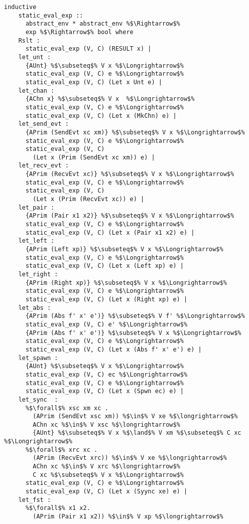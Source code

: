 \documentclass{article}
\begin{document}
\begin{lstlisting}[style=codestyle1, escapechar=\%]
  inductive
    static_eval_exp ::
      abstract_env * abstract_env %$\Rightarrow$%
      exp %$\Rightarrow$% bool where
    Rslt :
      static_eval_exp (V, C) (RESULT x) |
    let_unt :
      {AUnt} %$\subseteq$% V x %$\Longrightarrow$%
      static_eval_exp (V, C) e %$\Longrightarrow$% 
      static_eval_exp (V, C) (Let x Unt e) |
    let_chan : 
      {AChn x} %$\subseteq$% V x  %$\Longrightarrow$%
      static_eval_exp (V, C) e %$\Longrightarrow$%
      static_eval_exp (V, C) (Let x (MkChn) e) |
    let_send_evt : 
      {APrim (SendEvt xc xm)} %$\subseteq$% V x %$\Longrightarrow$%
      static_eval_exp (V, C) e %$\Longrightarrow$% 
      static_eval_exp (V, C)
        (Let x (Prim (SendEvt xc xm)) e) |
    let_recv_evt :
      {APrim (RecvEvt xc)} %$\subseteq$% V x %$\Longrightarrow$%
      static_eval_exp (V, C) e %$\Longrightarrow$% 
      static_eval_exp (V, C)
        (Let x (Prim (RecvEvt xc)) e) |
    let_pair : 
      {APrim (Pair x1 x2)} %$\subseteq$% V x %$\Longrightarrow$%
      static_eval_exp (V, C) e %$\Longrightarrow$% 
      static_eval_exp (V, C) (Let x (Pair x1 x2) e) |
    let_left : 
      {APrim (Left xp)} %$\subseteq$% V x %$\Longrightarrow$%
      static_eval_exp (V, C) e %$\Longrightarrow$% 
      static_eval_exp (V, C) (Let x (Left xp) e) |
    let_right :
      {APrim (Right xp)} %$\subseteq$% V x %$\Longrightarrow$%
      static_eval_exp (V, C) e %$\Longrightarrow$% 
      static_eval_exp (V, C) (Let x (Right xp) e) |
    let_abs : 
      {APrim (Abs f' x' e')} %$\subseteq$% V f' %$\Longrightarrow$%
      static_eval_exp (V, C) e' %$\Longrightarrow$%
      {APrim (Abs f' x' e')} %$\subseteq$% V x %$\Longrightarrow$%
      static_eval_exp (V, C) e %$\Longrightarrow$% 
      static_eval_exp (V, C) (Let x (Abs f' x' e') e) |
    let_spawn :
      {AUnt} %$\subseteq$% V x %$\Longrightarrow$%
      static_eval_exp (V, C) ec %$\Longrightarrow$% 
      static_eval_exp (V, C) e %$\Longrightarrow$%  
      static_eval_exp (V, C) (Let x (Spwn ec) e) |
    let_sync  : 
      %$\forall$% xsc xm xc . 
        (APrim (SendEvt xsc xm)) %$\in$% V xe %$\longrightarrow$% 
        AChn xc %$\in$% V xsc %$\longrightarrow$%
        {AUnt} %$\subseteq$% V x %$\land$% V xm %$\subseteq$% C xc %$\Longrightarrow$%
      %$\forall$% xrc xc . 
        (APrim (RecvEvt xrc)) %$\in$% V xe %$\longrightarrow$%
        AChn xc %$\in$% V xrc %$\longrightarrow$%
        C xc %$\subseteq$% V x %$\Longrightarrow$%
      static_eval_exp (V, C) e %$\Longrightarrow$%  
      static_eval_exp (V, C) (Let x (Syync xe) e) |
    let_fst : 
      %$\forall$% x1 x2.
        (APrim (Pair x1 x2)) %$\in$% V xp %$\longrightarrow$%

\end{lstlisting}
\end{document}
